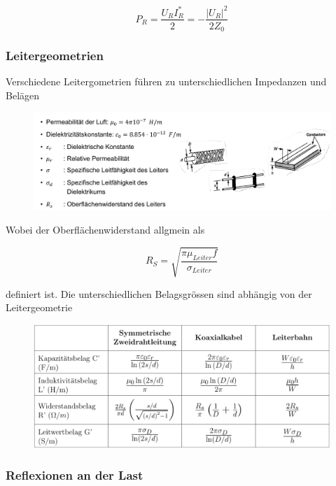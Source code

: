 \documentclass[
  10pt,
  a4paper,
  german]{article}
\numberwithin{equation}{section}
\begin{document}
\[
P_R=\frac{U_RI_R^*}{2}=-\frac{|U_R|^2}{2Z_0}
\]

\hypertarget{leitergeometrien}{%
\subsubsection{Leitergeometrien}\label{leitergeometrien}}

Verschiedene Leitergometrien führen zu unterschiedlichen Impedanzen und
Belägen

\begin{figure}[H]

{\centering \includegraphics{images/03_leiterimpedanzen.png}

}

\end{figure}

Wobei der Oberflächenwiderstand allgmein als

\[
R_S=\sqrt{\frac{\pi\mu_{Leiter}f}{\sigma_{Leiter}}}
\]

definiert ist. Die unterschiedlichen Belagsgrössen sind abhängig von der
Leitergeometrie

\begin{figure}[H]

{\centering \includegraphics{images/03_Belagsgroessen.png}

}

\end{figure}

\hypertarget{reflexionen-an-der-last}{%
\subsubsection{Reflexionen an der Last}\label{reflexionen-an-der-last}}
\end{document}
